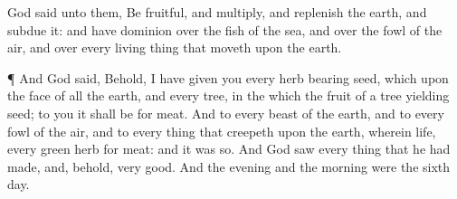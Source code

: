 {God
said unto them, Be
fruitful, and
multiply, and
replenish the
earth, and subdue
it: and have
dominion over the
fish of the
sea, and over the
fowl of the
air, and over every living
thing that
moveth upon the
earth.
\par }{\PP {}¶ And
God
said,
Behold, I have
given you every
herb
bearing
seed, which
{} upon the
face of all the
earth, and every
tree, in the which
{} the
fruit of a
tree
yielding
seed; to you it shall
be for
meat.
And to every
beast of the
earth, and to every
fowl of the
air, and to every thing that
creepeth upon the
earth, wherein
{}
life,
{} every
green
herb for
meat: and it was so.
And
God
saw every thing
that he had
made, and, behold,
{}
very
good. And the
evening and the
morning were the
sixth
day.

}

